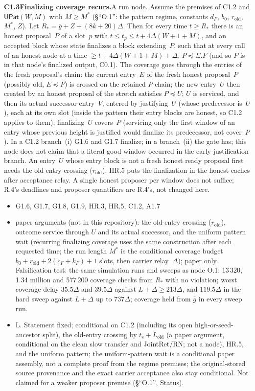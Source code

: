 \documentclass{article}
\newcommand{\cF}{c_F}
\newcommand{\dagnode}[6]{%
\par\medskip\noindent\textbf{#1\enspace #2.}\enspace #3
\begin{itemize}[leftmargin=2.2em,itemsep=0pt,topsep=2pt]
\item[\emph{Uses}] #4
\item[\emph{Evid.}] #5
\item[\emph{Task}] #6
\end{itemize}}
\begin{document}
\dagnode{C1.3}{Finalizing coverage recurs}{A run node.  Assume the premises of
C1.2 and $\mathsf{UPat}(W,M)$ with $M\geq M^*$ (\S``O.1'': the pattern regime,
constants $d_F$, $b_0$, $r_{\mathrm{old}}$, $M^*$, $Z$).  Let
$R_*=\bar g+Z+(8k+20)\Delta$.  Then for every time $t\geq R_*$ there is an
honest proposal~$P$ of a slot~$p$ with $t\leq t_p\leq t+4\Delta(W+1+M)$, and an
accepted block whose state finalizes a block extending~$P$, such that at every
call of an honest node at a time
$\geq t+4\Delta(W+1+M)+\Delta$, $P\preceq\Sigma.F$ (and so $P$ is in that
node's finalized output, C0.1).  The coverage goes through the entries of the
fresh proposal's chain: the current entry~$E$ of the fresh honest proposal~$P$
(possibly old, $E\preceq P$) is crossed on the retained $P$-chain; the new
entry~$U$ then created by an honest proposal of the stretch satisfies
$P\preceq U$; $U$ is serviced, and then its actual successor entry~$V$, entered by justifying~$U$ (whose
predecessor is~$U$), each at its own slot (inside the pattern their entry blocks
are honest, so C1.2 applies to them); finalizing~$U$ covers~$P$ (servicing only
the first window of an entry whose previous height is justified would finalize its predecessor, not
cover~$P$).  In a C1.2
branch~(i) G1.6 and G1.7 finalize; in a branch~(ii) the gate has; this node
does not claim that a literal good window occurred in the early-justification
branch.  An entry~$U$ whose entry block is not a fresh honest ready proposal
first needs the old-entry crossing ($r_{\mathrm{old}}$).  HR.5 puts the
finalization in the honest caches after acceptance relay.  A single honest
proposer per window does not suffice; R.4's deadlines
and proposer quantifiers are R.4's, not changed here.}
{G1.6, G1.7, G1.8, G1.9, HR.3, HR.5, C1.2, A1.7}{paper arguments (not in
this repository): the old-entry crossing ($r_{\mathrm{old}}$), outcome service
through $U$ and its actual successor, and the uniform pattern wait (recurring
finalizing coverage uses the same construction after each requested time; the
run length $M^*$ is the conditional coverage budget
$b_0+r_{\mathrm{old}}+2(\cF+k_F)+1$ slots, then carrier relay~$\Delta$); paper
only.  Falsification test: the same simulation runs and sweeps as node O.1: 13\,320, 1.34 million and
577\,200 coverage checks from $R_*$ with no violation; worst coverage delay
$35.5\Delta$ and $39.5\Delta$ against $L+\Delta\geq213\Delta$, and $119.5\Delta$
in the hard sweep against $L+\Delta$ up to $737\Delta$; coverage held from
$\bar g$ in every sweep run.}{L.  Statement fixed;
conditional on C1.2 (including its open high-or-seed-ancestor split), the
old-entry crossing by $t_s+L_{\mathrm{old}}$ (a paper argument, conditional on
the clean slow transfer and JointRet/RN; not a node), HR.5,
and the uniform pattern; the uniform-pattern wait is a conditional paper
assembly, not a complete proof from the
regime premises; the original-stored source provenance and the exact carrier
acceptance also stay conditional.  Not claimed for a weaker proposer
premise (\S``O.1'', Status).}
\end{document}
